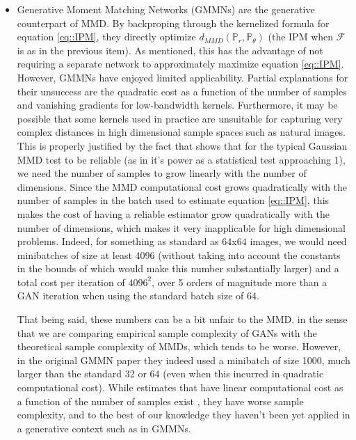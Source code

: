 \documentclass{article} %
\newcommand\PP{\mathbb{P}}
\theoremstyle{definition}
\theoremstyle{definition}
\newcommand\manF{\mathcal{F}}
\begin{document}
\begin{itemize}
\item Generative Moment Matching Networks (GMMNs) \cite{Li-ea-GMMN, Dz-ea-GMMD}
are the generative counterpart of MMD. By backproping through
the kernelized formula for equation \eqref{eq::IPM}, they directly
optimize $d_{MMD}(\PP_r, \PP_\theta)$ (the IPM when $\manF$ is
as in the previous item). As mentioned, this has the advantage
of not requiring a separate network to approximately maximize
equation \eqref{eq::IPM}. However, GMMNs have enjoyed limited applicability.
Partial explanations for their unsuccess are the quadratic cost as a function
of the number of samples and vanishing gradients for low-bandwidth kernels.
Furthermore, it may be possible that some
kernels used in practice are unsuitable for capturing very complex
distances in high dimensional sample spaces such as natural images.
This is properly justified by the fact that \cite{Ramdas-ea-hdk}
shows that for the typical Gaussian MMD test to be reliable (as in it's power
as a statistical test approaching 1), we need the number of
samples to grow linearly with the number of dimensions. Since
the MMD computational cost grows quadratically with the number
of samples in the batch used to estimate equation \eqref{eq::IPM},
this makes the cost of having a reliable estimator
grow quadratically with the number of dimensions, which makes it
very inapplicable for high dimensional problems. Indeed, for
something as standard as $64$x$64$ images, we would need minibatches
of size at least $4096$ (without taking into account the constants
in the bounds of \cite{Ramdas-ea-hdk} which would make this number
substantially larger) and a total cost per iteration of
$4096^2$, over 5 orders of magnitude more than a
GAN iteration when using the standard batch size of 64.

That being said, these numbers can be a bit unfair to the MMD,
in the sense that we are comparing empirical sample complexity of
GANs with the theoretical sample complexity of MMDs, which tends
to be worse. However, in the original GMMN paper \cite{Li-ea-GMMN} they
indeed used a minibatch of size 1000, much larger than the standard
32 or 64 (even when this incurred in quadratic computational cost).
While estimates that have linear computational cost as a function of the number
of samples exist \cite{Gretton-ea-MMD},
they have worse sample complexity, and to the best of
our knowledge they haven't been yet applied in a generative context
such as in GMMNs.

\end{itemize}
\end{document}
